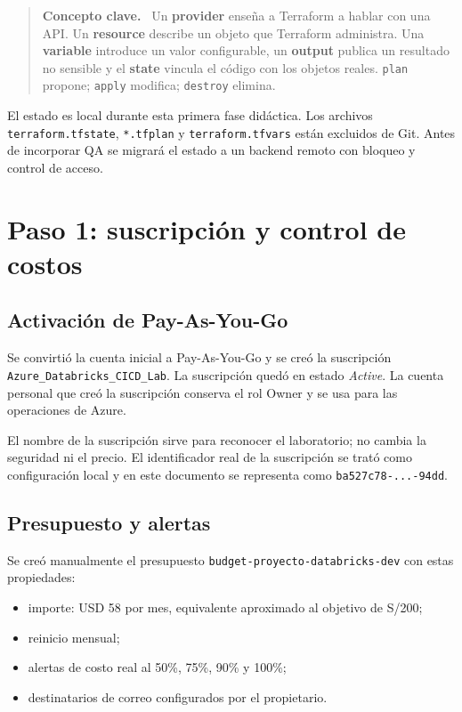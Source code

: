 \documentclass[11pt,a4paper]{article}
\newcommand{\concepto}[1]{\textcolor{dbblue}{\textbf{#1}}}
\newenvironment{aprendizaje}{
  \begin{quote}\color{dbblue}\textbf{Concepto clave.}\ }{
  \end{quote}}
\begin{document}
\begin{aprendizaje}
Un \concepto{provider} enseña a Terraform a hablar con una API. Un \concepto{resource} describe un
objeto que Terraform administra. Una \concepto{variable} introduce un valor configurable, un
\concepto{output} publica un resultado no sensible y el \concepto{state} vincula el código con los
objetos reales. \texttt{plan} propone; \texttt{apply} modifica; \texttt{destroy} elimina.
\end{aprendizaje}

El estado es local durante esta primera fase didáctica. Los archivos \texttt{terraform.tfstate},
\texttt{*.tfplan} y \texttt{terraform.tfvars} están excluidos de Git. Antes de incorporar QA se
migrará el estado a un backend remoto con bloqueo y control de acceso.

\section{Paso 1: suscripción y control de costos}

\subsection{Activación de Pay-As-You-Go}

Se convirtió la cuenta inicial a Pay-As-You-Go y se creó la suscripción
\texttt{Azure\_Databricks\_CICD\_Lab}. La suscripción quedó en estado \textit{Active}. La cuenta
personal que creó la suscripción conserva el rol Owner y se usa para las operaciones de Azure.

El nombre de la suscripción sirve para reconocer el laboratorio; no cambia la seguridad ni el
precio. El identificador real de la suscripción se trató como configuración local y en este
documento se representa como \texttt{ba527c78-...-94dd}.

\subsection{Presupuesto y alertas}

Se creó manualmente el presupuesto \texttt{budget-proyecto-databricks-dev} con estas propiedades:

\begin{itemize}
  \item importe: USD 58 por mes, equivalente aproximado al objetivo de S/200;
  \item reinicio mensual;
  \item alertas de costo real al 50\%, 75\%, 90\% y 100\%;
  \item destinatarios de correo configurados por el propietario.
\end{itemize}
\end{document}
